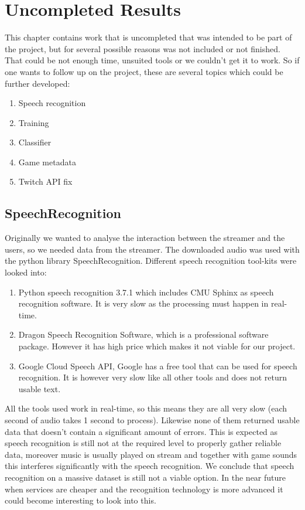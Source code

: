 \documentclass[final]{report}
\begin{document}
\chapter{Uncompleted Results}
\label{ch:Uncompleted Results}

This chapter contains work that is uncompleted that was intended to be part of the project, but for several possible reasons was not included or not finished. That could be not enough time, unsuited tools or we couldn't get it to work. So if one wants to follow up on the project, these are several topics which could be further developed:

\begin{enumerate}
	\item Speech recognition
	\item Training
	\item Classifier
	\item Game metadata
	\item Twitch API fix
\end{enumerate}

\section{SpeechRecognition}
Originally we wanted to analyse the interaction between the streamer and the users, so we needed data from the streamer.
The downloaded audio was used with the python library SpeechRecognition. %
Different speech recognition tool-kits were looked into:
\begin{enumerate}
\item Python speech recognition 3.7.1 which includes CMU Sphinx as speech recognition software. It is very slow as the processing must happen in real-time.
\item Dragon Speech Recognition Software, which is a professional software package. However it has high price which makes it not viable for our project.
\item Google Cloud Speech API, Google has a free tool that can be used for speech recognition. It is however very slow like all other tools and does not return usable text.
\end{enumerate}

All the tools used work in real-time, so this means they are all very slow (each second of audio takes 1 second to process). Likewise none of them returned usable data that doesn't contain a significant amount of errors.
This is expected as speech recognition is still not at the required level to properly gather reliable data, moreover music is usually played on stream and together with game sounds this interferes significantly with the speech recognition.
We conclude that speech recognition on a massive dataset is still not a viable option.
In the near future when services are cheaper and the recognition technology is more advanced it could become interesting to look into this.
\end{document}

